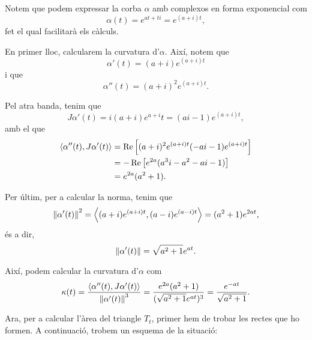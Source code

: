\documentclass[a4paper, 11pt]{article}
\begin{document}
  \begin{solution}
    Notem que podem expressar la corba $\alpha$ amb complexos en forma
    exponencial com
    \[
      \alpha(t) = e^{at + ti} = e^{(a + i)t},
    \]
    fet el qual facilitarà els càlculs.

    En primer lloc, calcularem la curvatura d'$\alpha$. Així, notem que
    \[
      \alpha'(t) = (a + i)e^{(a + i)t}
    \]
    i que
    \[
      \alpha''(t) = (a + i)^2e^{(a + i)t}.
    \]

    Pel atra banda, tenim que
    \[
      J \alpha'(t) = i (a + i)e^{a + i}t =
      (ai - 1)e^{(a + i)t},
    \]
    amb el que
    \[
      \begin{split}
        \left\langle\alpha''(t), J \alpha'(t)\right\rangle
        &= \operatorname{Re}\left[(a + i)^2e^{(a + i)t}
        (-ai - 1)e^{(a + i)t}\right] \\
        &= -\operatorname{Re}\left[e^{2a}(a^3i -a^2 -ai - 1)\right] \\
        &= e^{2a} (a^2 + 1).
      \end{split} 
    \]

    Per últim, per a calcular la norma, tenim que
    \[
      \left\lVert\alpha'(t)\right\rVert^2 
      = \left\langle(a + i)e^{(a + i)t}, (a - i)e^{(a - i)t}\right\rangle
      = (a^2 + 1)e^{2at},
    \]
    és a dir,
    \[
      \left\lVert\alpha'(t)\right\rVert = \sqrt{a^2 + 1}e^{at}.
    \]

    Així, podem calcular la curvatura d'$\alpha$ com
    \[
      \kappa(t) = \frac{\gen{\alpha''(t), J \alpha'(t)}}%
      {\norm{\alpha'(t)}^3}
      = \frac{e^{2a}(a^2 + 1)}{(\sqrt{a^2 + 1}e^{at})^3}
      = \frac{e^{-at}}{\sqrt{a^2 + 1}}.
    \]
    
    Ara, per a calcular l'àrea del triangle $T_t$, primer hem de trobar
    les rectes que ho formen. A continuació, trobem un esquema de la
    situació:
    \begin{center}
\end{center}
\end{solution}
\end{document}
